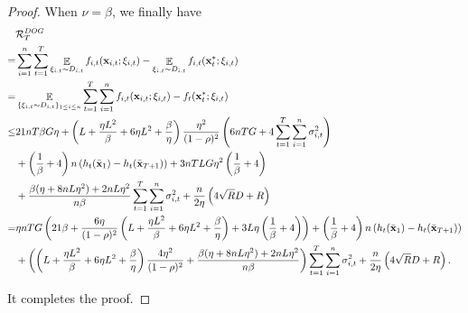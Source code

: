 \documentclass{article}
\begin{document}
\begin{proof}
When $\nu = \beta$, we finally have 
\begin{align}
\nonumber
& {\mathcal{R}}_T^{DOG} \\ \nonumber 
= & \sum_{i=1}^n\sum_{t=1}^T \mathop{\mathbb{E}}_{\xi_{i,t} \sim D_{i,t}}f_{i,t}({\bf x}_{i,t};\xi_{i,t}) - \mathop{\mathbb{E}}_{\xi_{i,t} \sim D_{i,t} }f_{i,t}({\bf x}_t^\ast;\xi_{i,t}) \\ \nonumber 
= & \mathop{\mathbb{E}}_{ \{\xi_{i,t} \sim D_{i,t}\}_{1\le i \le n} } \sum_{t=1}^T\sum_{i=1}^n f_{i,t}({\bf x}_{i,t};\xi_{i,t}) - f_t({\bf x}_t^\ast;\xi_{i,t}) \\ \nonumber
\le & 21 nT\beta G \eta + \left(  L + \frac{\eta L^2}{\beta}  + 6\eta L^2  + \frac{\beta}{\eta}  \right) \frac{\eta^2}{(1-\rho)^2}   \left(  6nTG + 4\sum_{t=1}^T\sum_{i=1}^n \sigma_{i,t}^2  \right) \\ \nonumber 
&+ \left( \frac{1}{\beta} + 4 \right)n\left( h_t(\bar{{\bf x}}_1) - h_t(\bar{{\bf x}}_{T+1}) \right)  + 3nTLG\eta^2\left(  \frac{1}{\beta} + 4  \right) \\ \nonumber 
& + \frac{\beta(\eta + 8nL\eta^2) + 2nL\eta^2}{n\beta} \sum_{t=1}^T\sum_{i=1}^n\sigma_{i,t}^2  + \frac{n}{2\eta}\left(  4\sqrt{R}D + R   \right) \\ \nonumber
= &  \eta nTG\left(  21\beta + \frac{6\eta}{(1-\rho)^2}\left(  L + \frac{\eta L^2}{\beta} + 6\eta L^2 + \frac{\beta}{\eta}  \right) + 3L\eta\left( \frac{1}{\beta} + 4 \right)   \right) + \left( \frac{1}{\beta}+4 \right)n \left( h_t(\bar{{\bf x}}_1) - h_t(\bar{{\bf x}}_{T+1}) \right) \\ \nonumber
& + \left(  \left(  L + \frac{\eta L^2}{\beta}  + 6\eta L^2  + \frac{\beta}{\eta}  \right) \frac{4\eta^2}{(1-\rho)^2} + \frac{\beta(\eta + 8nL\eta^2) + 2nL\eta^2}{n\beta}  \right) \sum_{t=1}^T\sum_{i=1}^n \sigma_{i,t}^2 + \frac{n}{2\eta}\left(  4\sqrt{R}D + R   \right).
\end{align} 

It completes the proof.









\end{proof}
\end{document}
